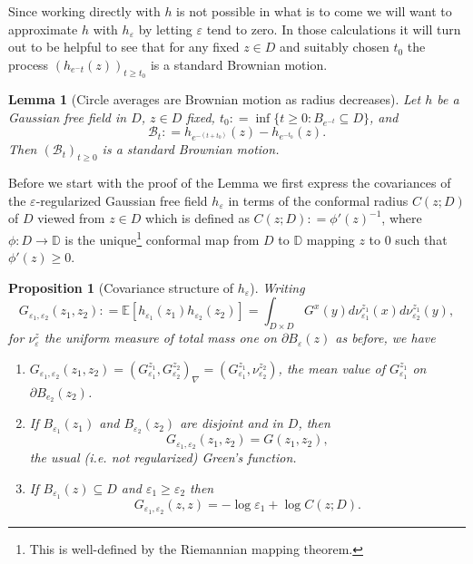 \documentclass[11pt,reqno]{amsart}
\numberwithin{equation}{section}
\newtheorem{lem}[thm]{Lemma}
\newtheorem{pro}[thm]{Proposition}
\newcommand{\deq}{\mathrel{\mathop:}=}
\newcommand{\eps}{\varepsilon}
\begin{document}
Since working directly with $h$ is not possible in what is to come we will want to approximate $h$ with $h_\eps$ by letting $\eps$ tend to zero. In those calculations it will turn out to be helpful to see that for any fixed $z\in D$ and suitably chosen $t_0$ the process $(h_{e^-t}(z))_{t\geq t_0}$ is a standard Brownian motion.

\begin{lem}[Circle averages are Brownian motion as radius decreases]\label{lem:hepsIsBM}
	Let $h$ be a Gaussian free field in $D$, $z\in D$ fixed, $t_0\deq\inf\{t\geq 0: B_{e^{-t}}\subseteq D\}$, and $$\mathcal B_t\deq h_{e^{-(t+t_0)}}(z)-h_{e^{-t_0}}(z).$$
	Then $(\mathcal B_t)_{t\geq 0}$ is a standard Brownian motion.
\end{lem}

Before we start with the proof of the Lemma we first express the covariances of the $\eps$-regularized Gaussian free field $h_\eps$ in terms of the conformal radius $C(z;D)$ of $D$ viewed from $z\in D$ which is defined as $C(z;D)\deq \phi'(z)^{-1}$, where $\phi:D\rightarrow\mathbb D$ is the unique\footnote{This is well-defined by the Riemannian mapping theorem.} conformal map from $D$ to $\mathbb D$ mapping $z$ to $0$ such that $\phi'(z)\geq 0$.

\begin{pro}[Covariance structure of $h_\eps$]\label{prop:covariancesOfRegularizedH}
	Writing $$G_{\eps_1,\eps_2}(z_1,z_2) \deq \mathbb E[h_{\eps_1}(z_1)h_{\eps_2}(z_2)] = \int_{D\times D} G^x(y)d\nu_{\eps_1}^{z_1}(x)d\nu_{\eps_2}^{z_1}(y),$$ for $\nu_\eps^z$ the uniform measure of total mass one on $\partial B_\eps(z)$ as before, we have
	\begin{enumerate}
		\item $G_{\eps_1,\eps_2}(z_1,z_2) = (G_{\eps_1}^{z_1},G_{\eps_2}^{z_2})_\nabla = (G_{\eps_1}^{z_1},\nu_{\eps_2}^{z_2})$, the mean value of $G_{\eps_1}^{z_1}$ on $\partial B_{e_2}(z_2)$.
		\item If $B_{\eps_1}(z_1)$ and $B_{\eps_2}(z_2)$ are disjoint and in $D$, then $$G_{\eps_1,\eps_2}(z_1,z_2) = G(z_1,z_2),$$ the usual (i.e. not regularized) Green's function.
		\item\label{item:covarianceForSameZdifferentEps} If $B_{\eps_1}(z)\subseteq D$ and $\eps_1\geq\eps_2$ then $$G_{\eps_1,\eps_2}(z,z)=-\log\eps_1+\log C(z;D).$$
	\end{enumerate}
\end{pro}
\end{document}
